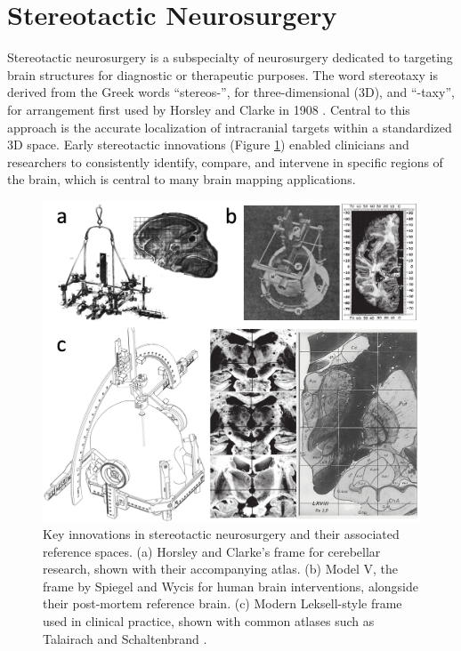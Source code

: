 \section{Stereotactic Neurosurgery}
\label{sec:SNSX}
Stereotactic neurosurgery is a subspecialty of neurosurgery dedicated to targeting brain structures for diagnostic or therapeutic purposes. The word stereotaxy is derived from the Greek words “stereos-”, for three-dimensional (3D), and “-taxy”, for arrangement first used by Horsley and Clarke in 1908 \cite{Horsley1908-om}. Central to this approach is the accurate localization of intracranial targets within a standardized 3D space. Early stereotactic innovations (Figure \ref{fig:ch1_Figure_stereoframe}) enabled clinicians and researchers to consistently identify, compare, and intervene in specific regions of the brain, which is central to many brain mapping applications.

\begin{figure}[hbt!]
    \centering
    \includegraphics[width=0.85\linewidth]{figs/ch1_Figure_stereoframe2.png}
    \caption{Key innovations in stereotactic neurosurgery and their associated reference spaces. (a) Horsley and Clarke’s \cite {Horsley1908-om} frame for cerebellar research, shown with their accompanying atlas. (b) Model V, the frame by Spiegel and Wycis \cite{Spiegel1947-rq} for human brain interventions, alongside their post-mortem reference brain. (c) Modern Leksell-style frame used in clinical practice, shown with common atlases such as Talairach \cite{Talairach1957-eb} and Schaltenbrand \cite{Schaltenbrand1977-ge}.}
    \label{fig:ch1_Figure_stereoframe}
\end{figure}

